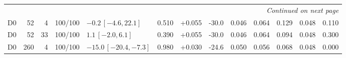 \documentclass[10pt,a4paper]{article}
\begin{document}
\begin{longtable}{crrcp{33mm}rrrrrrrr}
\midrule
\endhead
\midrule
\multicolumn{13}{r}{\emph{Continued on next page}}\\
\endfoot
\bottomrule
\endlastfoot
D0 & 52 & 4 & 100/100 & \(-0.2\,[-4.6,22.1]\) & 0.510 & +0.055 & -30.0 & 0.046 & 0.064 & 0.129 & 0.048 & 0.110\\
D0 & 52 & 33 & 100/100 & \(1.1\,[-2.0,6.1]\) & 0.390 & +0.055 & -30.0 & 0.046 & 0.064 & 0.094 & 0.048 & 0.300\\
D0 & 260 & 4 & 100/100 & \(-15.0\,[-20.4,-7.3]\) & 0.980 & +0.030 & -24.6 & 0.050 & 0.056 & 0.068 & 0.048 & 0.000\\

\end{longtable}
\end{document}
